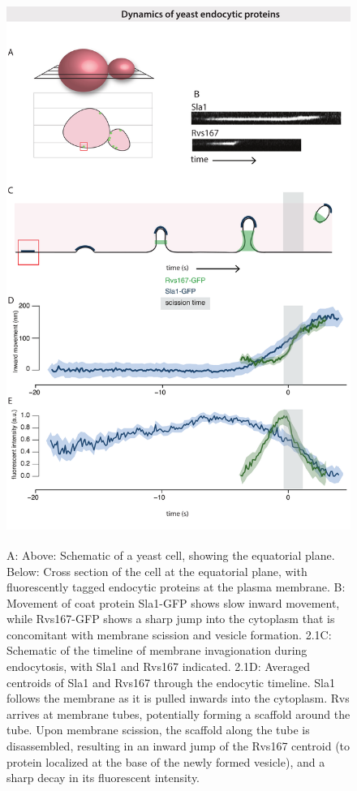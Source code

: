 \begin{figure}
	\centering
	\includegraphics[width=18cm,height=18cm,keepaspectratio, valign=t]{figures/results_final/yeast_schemat_fig1_C}
	\caption[Centroid tracking yeast endocytic proteins]
	{A: Above: Schematic of a yeast cell, showing the equatorial plane. Below: Cross section of the cell at the equatorial plane, with fluorescently tagged endocytic proteins at the plasma membrane. B: Movement of coat protein Sla1-GFP shows slow inward movement, while Rvs167-GFP shows a sharp jump into the cytoplasm that is concomitant with membrane scission and vesicle formation.
2.1C: Schematic of the timeline of membrane invagionation during endocytosis, with Sla1 and Rvs167 indicated. 2.1D: Averaged centroids of Sla1 and Rvs167 through the endocytic timeline. Sla1 follows the membrane as it is pulled inwards into the cytoplasm. Rvs arrives at membrane tubes, potentially forming a scaffold around the tube. Upon membrane scission, the scaffold along the tube is disassembled, resulting in an inward jump of the Rvs167 centroid (to protein localized at the base of the newly formed vesicle), and a sharp decay in its fluorescent intensity. 
 \label{fig1_schematic}}
\end{figure}

